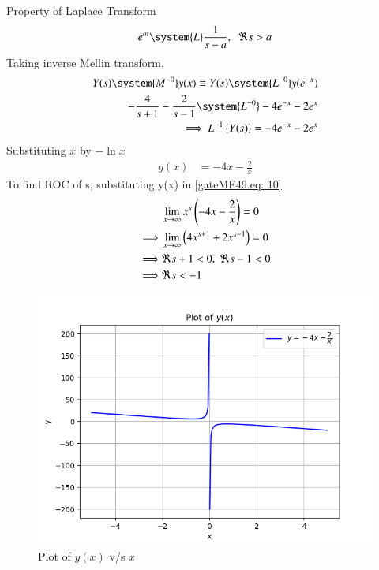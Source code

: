 \documentclass[journal,12pt,twocolumn]{IEEEtran}
\theoremstyle{remark}
\begin{document}
Property of Laplace Transform 
\begin{align}
     e^{at} \system{L} \frac{1}{s-a},\;\; \Re s>a 
\end{align}
Taking inverse Mellin transform,
 \begin{align}
    Y(s) \system{M^{-0}} y(x) \equiv Y(s) \system{L^{-0}} y(e^{-x})\\
    -\frac{4}{s+1}-\frac{2}{s-1}\system{L^{-0}} -4e^{-x}-2e^{x}\\
    \implies L^{-1} \cbrak{Y(s)} = -4e^{-x}-2e^{x}
\end{align}
Substituting $x$ by $-\ln x$
\begin{align}
    y(x)&=-4x-\frac{2}{x}
\end{align}
To find ROC of s, substituting y(x) in \eqref{gateME49.eq: 10}
\begin{align} 
    &\lim_{x\rightarrow \infty} x^s \left(-4x-\frac{2}{x}\right)=0\\ \label{gateME49.eq:24}
    \implies& \lim_{x\rightarrow \infty} \left(4x^{s+1}+2x^{s-1}\right)=0\\
    \implies& \Re s+1<0,\;\Re s-1<0\\
    \implies& \Re s<-1\label{gateME49.eq:27}
\end{align}

\begin{figure}[h]
    \centering
    \includegraphics[width=\columnwidth]{figs/fig.png}
    \caption{Plot of $y(x)$ v/s $x$}
\end{figure}
\end{document}
